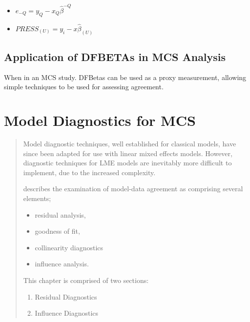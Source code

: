 	
	\begin{itemize}
		\item $e_{-Q} = y_{Q} - x_{Q}\hat{\beta}^{-Q}$
		\item $PRESS_{(U)} = y_{i} - x\hat{\beta}_{(U)}$
	\end{itemize}
	



\section{Application of DFBETAs in MCS Analysis}


When in an MCS study. DFBetas can be used as a proxy measurement, allowing simple techniques to be used for assessing agreement.



\chapter{Model Diagnostics for MCS}

\begin{abstract}
Model diagnostic techniques, well established for classical models, have since been adapted for use with linear mixed effects models. However, diagnostic techniques for LME models are inevitably more difficult to implement, due to the increased complexity. \\ \bigskip


\citet{schab} describes the examination of model-data agreement as comprising several elements; \begin{itemize}
		\item residual analysis, 
		\item goodness of fit, 
		\item collinearity diagnostics
		\item influence analysis.
	\end{itemize} 
	
This chapter is comprised of two sections:
\begin{enumerate}
	\item Residual Diagnostics
	\item Influence Diagnostics
\end{enumerate}
\end{abstract}

\newpage
